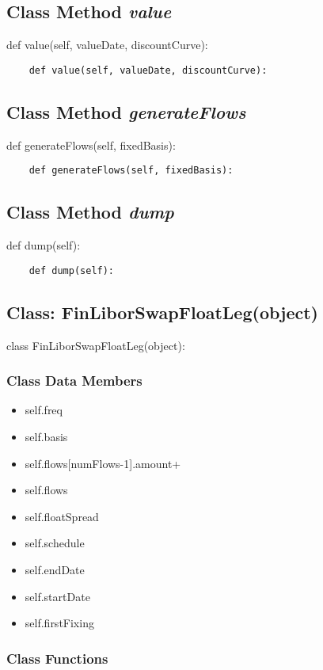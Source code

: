 \documentclass[twoside,11pt]{book}
\begin{document}
\subsection{Class Method {\it value}}
def value(self, valueDate, discountCurve):

\begin{lstlisting}
    def value(self, valueDate, discountCurve):
\end{lstlisting}

\subsection{Class Method {\it generateFlows}}
def generateFlows(self, fixedBasis):

\begin{lstlisting}
    def generateFlows(self, fixedBasis):
\end{lstlisting}

\subsection{Class Method {\it dump}}
def dump(self):

\begin{lstlisting}
    def dump(self):
\end{lstlisting}

\subsection{Class: FinLiborSwapFloatLeg(object)}
class FinLiborSwapFloatLeg(object):

\subsubsection{Class Data Members}
\begin{itemize}
\item{self.freq}
\item{self.basis}
\item{self.flows[numFlows-1].amount+}
\item{self.flows}
\item{self.floatSpread}
\item{self.schedule}
\item{self.endDate}
\item{self.startDate}
\item{self.firstFixing}
\end{itemize}

\subsubsection{Class Functions}
\end{document}
